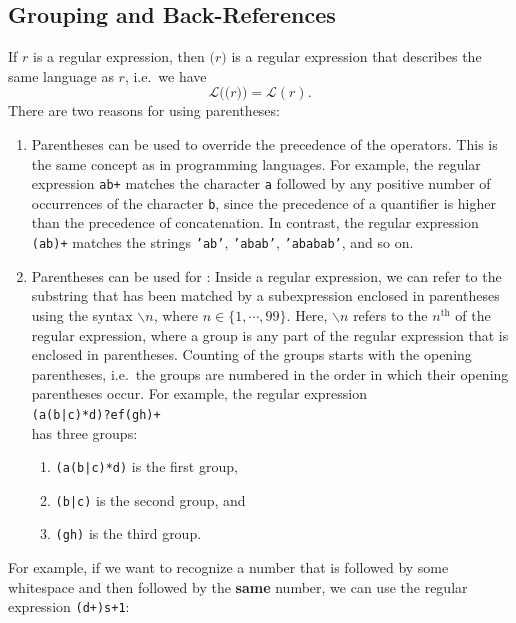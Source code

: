 \subsection{Grouping and Back-References \label{subsec:grouping}}
If $r$ is a regular expression, then $\texttt{(}r\texttt{)}$ is a regular expression that describes the same
language as $r$, i.e.\ we have
$$\mathcal{L}\bigl(\texttt{(}r\texttt{)}\bigr) = \mathcal{L}(r).$$
There are two reasons for using parentheses:
\begin{enumerate}
\item Parentheses can be used to override the precedence of the operators.  This is the same concept as in
      programming languages.  For example, the regular expression \texttt{ab+} matches the character \texttt{a}
      followed by any positive number of occurrences of the character \texttt{b}, since the precedence of a
      quantifier is higher than the precedence of concatenation.  In contrast, the regular expression
      \texttt{(ab)+} matches the strings \texttt{'ab'}, \texttt{'abab'}, \texttt{'ababab'}, and so on.
\item Parentheses can be used for : Inside a regular expression, we
      can refer to the substring that has been matched by a subexpression enclosed in parentheses using the
      syntax $\backslash n$, where $n \in \{1,\cdots,99\}$.  Here, $\backslash n$ refers to the $n^{\mathrm{th}}$
       of the regular expression, where a group is any part of the regular expression
      that is enclosed in parentheses.  Counting of the groups starts with the opening parentheses, i.e.\ the
      groups are numbered in the order in which their opening parentheses occur.  For example, the regular
      expression
      \\[0.2cm]
      \hspace*{1.3cm}
      \texttt{(a(b|c)*d)?ef(gh)+}
      \\[0.2cm]
      has three groups:
      \begin{enumerate}
      \item \texttt{(a(b|c)*d)} is the first group,
      \item \texttt{(b|c)} is the second group, and
      \item \texttt{(gh)} is the third group.
      \end{enumerate}
\end{enumerate}
For example, if we want to recognize a number that is followed by some whitespace and then followed by the
\textbf{same} number, we can use the regular expression \texttt{(d+)s+1}:

